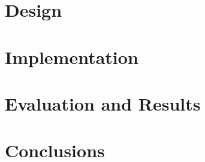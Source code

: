 \documentclass[logo,msc,cs]{infthesis}      %
\begin{document}
\chapter{Design}


\chapter{Implementation}


\chapter{Evaluation and Results}


\chapter{Conclusions}






\appendix


\end{document}
